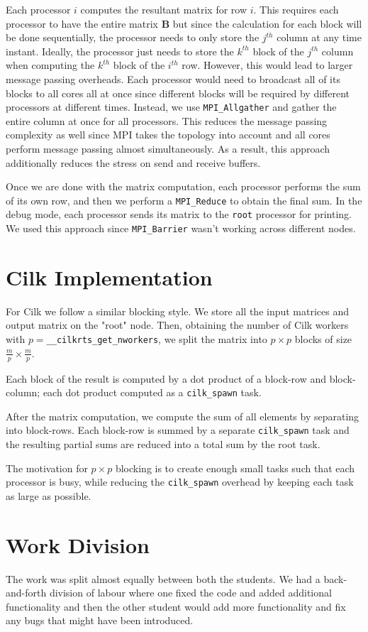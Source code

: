 \documentclass[11pt]{article}
\begin{document}
Each processor $i$ computes the resultant matrix for row $i$. This requires each processor to have the entire matrix $\mathbf{B}$ but since the calculation for each block will be done sequentially, the processor needs to only store the $j^{th}$ column at any time instant. Ideally, the processor just needs to store the $k^{th}$ block of the $j^{th}$ column when computing the $k^{th}$ block of the $i^{th}$ row. However, this would lead to larger message passing overheads. Each processor would need to broadcast all of its blocks to all cores all at once since different blocks will be required by different processors at different times. Instead, we use \texttt{MPI\_Allgather} and gather the entire column at once for all processors. This reduces the message passing complexity as well since MPI takes the topology into account and all cores perform message passing almost simultaneously. As a result, this approach additionally reduces the stress on send and receive buffers.\par
Once we are done with the matrix computation, each processor performs the sum of its own row, and then we perform a \texttt{MPI\_Reduce} to obtain the final sum. In the debug mode, each processor sends its matrix to the \texttt{root} processor for printing. We used this approach since \texttt{MPI\_Barrier} wasn't working across different nodes.

\section{Cilk Implementation}
For Cilk we follow a similar blocking style. We store all the input matrices and output matrix on the "root" node. Then, obtaining the number of Cilk workers with $p=$\texttt{\_\_cilkrts\_get\_nworkers}, we split the matrix into $p\times p$ blocks of size $\frac{m}{p}\times\frac{m}{p}$.\par
Each block of the result is computed by a dot product of a block-row and block-column; each dot product computed as a \texttt{cilk\_spawn} task.\par
After the matrix computation, we compute the sum of all elements by separating into block-rows. Each block-row is summed by a separate \texttt{cilk\_spawn} task and the resulting partial sums are reduced into a total sum by the root task.\par
The motivation for $p\times p$ blocking is to create enough small tasks such that each processor is busy, while reducing the \texttt{cilk\_spawn} overhead by keeping each task as large as possible.

\section{Work Division}
The work was split almost equally between both the students. We had a back-and-forth division of labour where one fixed the code and added additional functionality and then the other student would add more functionality and fix any bugs that might have been introduced.
\end{document}
